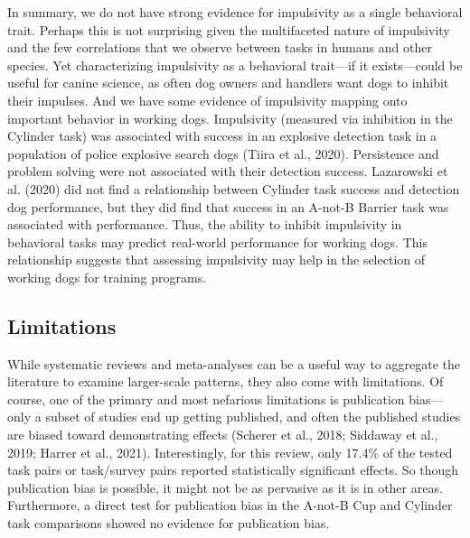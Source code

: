 \documentclass[
  ,pub,floatsintext]{apa6}
\begin{document}
In summary, we do not have strong evidence for impulsivity as a single behavioral trait. Perhaps this is not surprising given the multifaceted nature of impulsivity and the few correlations that we observe between tasks in humans and other species. Yet characterizing impulsivity as a behavioral trait---if it exists---could be useful for canine science, as often dog owners and handlers want dogs to inhibit their impulses. And we have some evidence of impulsivity mapping onto important behavior in working dogs. Impulsivity (measured via inhibition in the Cylinder task) was associated with success in an explosive detection task in a population of police explosive search dogs (Tiira et al., 2020). Persistence and problem solving were not associated with their detection success. Lazarowski et al. (2020) did not find a relationship between Cylinder task success and detection dog performance, but they did find that success in an A-not-B Barrier task was associated with performance. Thus, the ability to inhibit impulsivity in behavioral tasks may predict real-world performance for working dogs. This relationship suggests that assessing impulsivity may help in the selection of working dogs for training programs.

\hypertarget{limitations}{%
\subsection{Limitations}\label{limitations}}

While systematic reviews and meta-analyses can be a useful way to aggregate the literature to examine larger-scale patterns, they also come with limitations. Of course, one of the primary and most nefarious limitations is publication bias---only a subset of studies end up getting published, and often the published studies are biased toward demonstrating effects (Scherer et al., 2018; Siddaway et al., 2019; Harrer et al., 2021). Interestingly, for this review, only 17.4\% of the tested task pairs or task/survey pairs reported statistically significant effects. So though publication bias is possible, it might not be as pervasive as it is in other areas. Furthermore, a direct test for publication bias in the A-not-B Cup and Cylinder task comparisons showed no evidence for publication bias.
\end{document}
